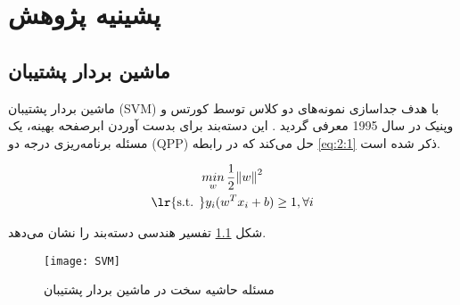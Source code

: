 
\chapter{پشینیه پژوهش} \label{ch:2}

\section{ماشین بردار پشتیبان} \label{sec:2:1}

ماشین بردار پشتیبان (\gls{SVM}) با هدف جداسازی نمونه‌های دو کلاس توسط کورتس و وپنیک در سال 1995 معرفی گردید \cite{vapnik1995}. این دسته‌بند برای بدست آوردن ابرصفحه بهینه، یک مسئله برنامه‌ریزی درجه دو (\gls{QPP}) حل می‌کند که در رابطه \ref{eq:2:1} ذکر شده است.

\begin{equation}
\begin{gathered} 
\mathop{min}\limits_{w}\frac{1}{2}{{\left\| w \right\|}^{2}} \\
\textrm{\lr{s.t. }} {{y}_{i}}({{w}^T}{{x}_{i}}+b)\ge 1,\forall i
\end{gathered}
\label{eq:2:1}
\end{equation}

شکل \ref{fig:SVM} تفسیر هندسی دسته‌بند را نشان می‌دهد.

\begin{figure}[!h]
	\centering
	\texttt{[image: SVM]}
	\caption{مسئله حاشیه سخت در ماشین بردار پشتیبان}
	\label{fig:SVM}
\end{figure}

